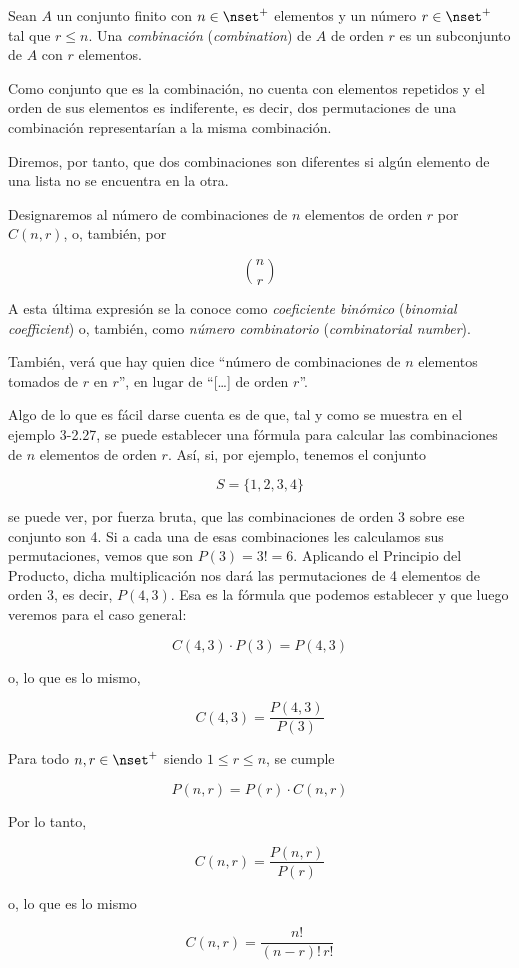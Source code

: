 \begin{deffinition}[Combinación]
  Sean $A$ un conjunto finito con $n \in \nset^{+}$ elementos y un número $r
  \in \nset^{+}$ tal que $r \leq n$. Una \emph{combinación}
  (\emph{combination}) de $A$ de orden $r$ es un subconjunto de $A$ con $r$
  elementos.

  Como conjunto que es la combinación, no cuenta con elementos repetidos y
  el orden de sus elementos es indiferente, es decir, dos permutaciones de
  una combinación representarían a la misma combinación.

  Diremos, por tanto, que dos combinaciones son diferentes si algún elemento
  de una lista no se encuentra en la otra.
\end{deffinition}

Designaremos al número de combinaciones de $n$ elementos de orden $r$ por
$C(n, r)$, o, también, por

$$ {n \choose r} $$

\noindent A esta última expresión se la conoce como \emph{coeficiente binómico}
(\emph{binomial coefficient}) o, también, como \emph{número combinatorio}
(\emph{combinatorial number}).

También, verá que hay quien dice ``número de combinaciones de $n$ elementos
tomados de $r$ en $r$'', en lugar de ``[\ldots] de orden $r$''.

Algo de lo que es fácil darse cuenta es de que, tal y como se muestra en el
ejemplo 3-2.27, se puede establecer una fórmula para calcular las
combinaciones de $n$ elementos de orden $r$. Así, si, por ejemplo, tenemos
el conjunto

$$ S = \{1, 2, 3, 4\} $$

\noindent se puede ver, por fuerza bruta, que las combinaciones de orden 3
sobre ese conjunto son 4. Si a cada una de esas combinaciones les calculamos
sus permutaciones, vemos que son $P(3) = 3! = 6$. Aplicando el Principio del
Producto, dicha multiplicación nos dará las permutaciones de 4 elementos de
orden 3, es decir, $P(4, 3)$. Esa es la fórmula que podemos establecer y que
luego veremos para el caso general:

$$ C(4, 3) \cdot P(3) = P(4, 3) $$

\noindent o, lo que es lo mismo,

$$ C(4, 3) = \frac{P(4, 3)}{P(3)} $$

\begin{theorem}
  Para todo $n, r \in \nset^{+}$ siendo $1 \leq r \leq n$, se cumple

  $$ P(n, r) = P(r) \cdot C(n, r) $$

  \noindent Por lo tanto,

  $$ C(n, r) = \frac{P(n, r)}{P(r)} $$

  \noindent o, lo que es lo mismo

  $$ C(n, r) = \frac{n!}{(n-r)! \, r!} $$
\end{theorem}

